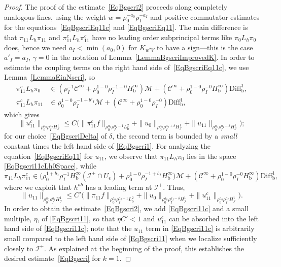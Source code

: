 \documentclass[reqno,11pt,letterpaper]{amsart}
\numberwithin{equation}{section}
\numberwithin{figure}{section}
\theoremstyle{definition}
\theoremstyle{remark}
\newcommand{\mc}{\mathcal}
\newcommand{\cC}{\mc C}
\newcommand{\cM}{\mc M}
\newcommand{\ms}{\mathscr}
\newcommand{\scri}{\ms I}
\newcommand{\eps}{\epsilon}
\newcommand{\bop}{{\mathrm{b}}}
\newcommand{\Diff}{\mathrm{Diff}}
\newcommand{\Diffb}{\Diff_\bop}
\newcommand{\CI}{\cC^\infty}
\newcommand{\Hb}{H_{\bop}}
\newcommand{\Hscri}{H_{\scri}}
\begin{document}
\begin{proof}
  The proof of the estimate~\eqref{EqBgscri2} proceeds along completely analogous lines, using the weight $w=\rho_0^{-a_0}\rho_I^{-a_I}$ and positive commutator estimates for the equations~\eqref{EqBgscriEq11c} and \eqref{EqBgscriEq11}. The main difference is that $\pi_{1 1}L_h\pi_{1 1}$ and $\pi_{1 1}^c L_h\pi_{1 1}^c$ have no leading order subprincipal terms like $\pi_0 L_h\pi_0$ does, hence we need $a_I<\min(a_0,0)$ for $K_{w^2 V}$ to have a sign---this is the case $a'_I=a_I$, $\gamma=0$ in the notation of Lemma~\ref{LemmaBgscriImprovedK}. In order to estimate the coupling terms on the right hand side of~\eqref{EqBgscriEq11c}, we use Lemma~\ref{LemmaEinNscri}, so
  \begin{align}
  \label{EqBgscri11cLh0Space}
    \pi_{1 1}^c L_h\pi_0 &\in (\rho_I^{-1}\CI + \rho_0^{1-0}\rho_I^{-1-0}\Hb^\infty)\cM + (\CI+\rho_0^{1-0}\rho_I^{-0}\Hb^\infty)\Diffb^1, \\
    \pi_{1 1}^c L_h\pi_{1 1} &\in \rho_0^{1-0}\rho_I^{-1+b'_I}\cM + (\CI+\rho_0^{1-0}\rho_I^{-0})\Diffb^1, \nonumber
  \end{align}
  which gives
  \begin{equation}
  \label{EqBgscri11c}
    \| u_{1 1}^c \|_{\rho_0^{a_0}\rho_I^{a_I}\Hscri^1} \leq C\bigl(\|\pi_{1 1}^c f\|_{\rho_0^{a_0}\rho_I^{a_I-1}L^2_\bop} + \| u_0 \|_{\rho_0^{a_0}\rho_I^{a_I+\delta}\Hscri^1} + \| u_{1 1} \|_{\rho_0^{a_0}\rho_I^{a_I-\delta}\Hscri^1}\bigr);
  \end{equation}
  for our choice~\eqref{EqBgscriDelta} of $\delta$, the second term is bounded by a \emph{small} constant times the left hand side of \eqref{EqBgscri1}. For analyzing the equation~\eqref{EqBgscriEq11} for $u_{1 1}$, we observe that $\pi_{1 1}L_h\pi_0$ lies in the space \eqref{EqBgscri11cLh0Space}, while
  \[
    \pi_{1 1}L_h\pi_{1 1}^c \in \bigl(\rho_0^{1+b_0}\rho_I^{-1}\Hb^\infty(\scri^+\cap U_\eps)+\rho_0^{1-0}\rho_I^{-1+b_I}\Hb^\infty\bigr)\cM + (\CI+\rho_0^{1-0}\rho_I^{-0}\Hb^\infty)\Diffb^1,
  \]
  where we exploit that $h^{\bar a\bar b}$ has a leading term at $\scri^+$. Thus,
  \begin{equation}
  \label{EqBgscri11}
    \| u_{1 1} \|_{\rho_0^{a_0}\rho_I^{a_I}\Hscri^1} \leq C'\bigl(\|\pi_{1 1} f\|_{\rho_0^{a_0}\rho_I^{a_I-1}L^2_\bop} + \| u_0 \|_{\rho_0^{a_0}\rho_I^{a_I-\delta}\Hscri^1} + \| u_{1 1}^c \|_{\rho_0^{a_0}\rho_I^{a_I}\Hscri^1}\bigr).
  \end{equation}
  In order to obtain the estimate~\eqref{EqBgscri2}, we add \eqref{EqBgscri11c} and a small multiple, $\eta$, of \eqref{EqBgscri11}, so that $\eta C'<1$ and $u_{1 1}^c$ can be absorbed into the left hand side of \eqref{EqBgscri11c}; note that the $u_{1 1}$ term in \eqref{EqBgscri11c} is arbitrarily small compared to the left hand side of \eqref{EqBgscri11} when we localize sufficiently closely to $\scri^+$. As explained at the beginning of the proof, this establishes the desired estimate~\eqref{EqBgscri} for $k=1$.


\end{proof}
\end{document}
